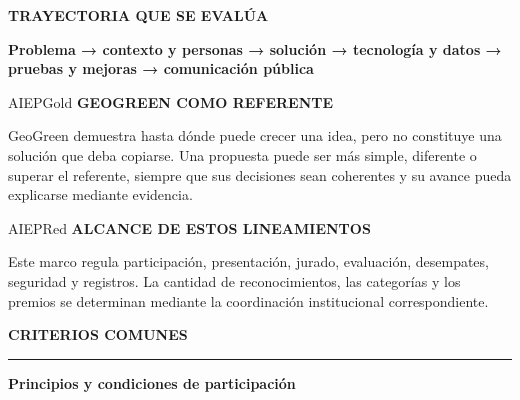 \documentclass[10pt,a4paper]{article}
\newcommand{\kicker}[1]{%
  {\color{AIEPRed}\scriptsize\bfseries\MakeUppercase{#1}}\par\vspace{2.4mm}
  {\color{AIEPRed}\rule{13mm}{1.2pt}}\vspace{3mm}
}
\newcommand{\labeltext}[1]{%
  {\scriptsize\bfseries\color{AIEPSlate}\MakeUppercase{#1}}\par\vspace{1.2mm}
}
\begin{document}
\begin{card}
\labeltext{Trayectoria que se evalúa}
\centering
{\large\bfseries\color{AIEPNavy}
Problema → contexto y personas → solución → tecnología y datos → pruebas y mejoras → comunicación pública}
\end{card}

\begin{softcard}{AIEPGold}
\labeltext{GeoGreen como referente}
GeoGreen demuestra hasta dónde puede crecer una idea, pero no constituye una solución que deba
copiarse. Una propuesta puede ser más simple, diferente o superar el referente, siempre que sus
decisiones sean coherentes y su avance pueda explicarse mediante evidencia.
\end{softcard}

\begin{softcard}{AIEPRed}
\labeltext{Alcance de estos lineamientos}
Este marco regula participación, presentación, jurado, evaluación, desempates, seguridad y
registros. La cantidad de reconocimientos, las categorías y los premios se determinan mediante
la coordinación institucional correspondiente.
\end{softcard}

\newpage
\kicker{Criterios comunes}
{\LARGE\bfseries\color{AIEPNavy} Principios y condiciones de participación}\par
\vspace{4mm}
\end{document}

